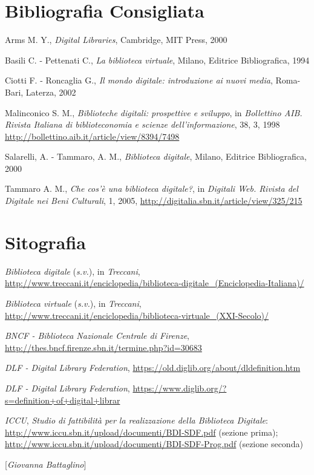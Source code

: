 \section*{Bibliografia Consigliata}
{\parindent0pt 
Arms M. Y., \emph{Digital Libraries}, Cambridge, MIT Press, 2000

Basili C. - Pettenati C., \emph{La biblioteca virtuale}, Milano,
Editrice Bibliografica, 1994

Ciotti F. - Roncaglia G., \emph{Il mondo digitale: introduzione ai nuovi
media}, Roma-Bari, Laterza, 2002

Malinconico S. M., \emph{Biblioteche digitali: prospettive e sviluppo},
in \emph{Bollettino AIB. Rivista Italiana di biblioteconomia e scienze
dell'informazione}, 38, 3, 1998
\url{http://bollettino.aib.it/article/view/8394/7498}

Salarelli, A. - Tammaro, A. M., \emph{Biblioteca digitale}, Milano,
Editrice Bibliografica, 2000

Tammaro A. M., \emph{Che cos'è una biblioteca digitale?}, in
\emph{Digitali Web. Rivista del Digitale nei Beni Culturali}, 1, 2005,
\url{http://digitalia.sbn.it/article/view/325/215}
}

\section*{Sitografia}
{\parindent0pt 
\emph{Biblioteca digitale} (\emph{s.v.}), in \emph{Treccani},
\url{http://www.treccani.it/enciclopedia/biblioteca-digitale_(Enciclopedia-Italiana)/}


\emph{Biblioteca virtuale} (\emph{s.v.}), in \emph{Treccani},
\url{http://www.treccani.it/enciclopedia/biblioteca-virtuale_(XXI-Secolo)/}


\emph{BNCF - Biblioteca Nazionale Centrale di Firenze},
\url{http://thes.bncf.firenze.sbn.it/termine.php?id=30683}

\emph{DLF - Digital Library Federation},
\url{https://old.diglib.org/about/dldefinition.htm}

\emph{DLF - Digital Library Federation},
\url{https://www.diglib.org/?s=definition+of+digital+librar}

\emph{ICCU}, \emph{Studio di fattibilità per la realizzazione della
Biblioteca Digitale}:
\url{http://www.iccu.sbn.it/upload/documenti/BDI-SDF.pdf}
(sezione prima);
\url{http://www.iccu.sbn.it/upload/documenti/BDI-SDF-Prog.pdf}
(sezione seconda)
}

\hrulefill 
 
{[}\emph{Giovanna Battaglino}{]}

